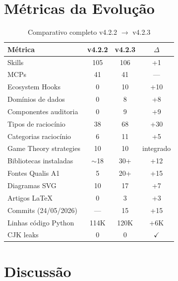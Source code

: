 \documentclass[12pt,a4paper]{article}
\begin{document}
\section{Métricas da Evolução}

\begin{table}[H]
  \centering
  \caption{Comparativo completo v4.2.2 $\rightarrow$ v4.2.3}
  \begin{tabular}{l c c c}
    \toprule
    \textbf{Métrica} & \textbf{v4.2.2} & \textbf{v4.2.3} & \textbf{$\Delta$} \\
    \midrule
    Skills                 & 105  & 106  & +1 \\
    MCPs                   & 41   & 41   & --- \\
    Ecosystem Hooks        & 0    & 10   & +10 \\
    Domínios de dados      & 0    & 8    & +8 \\
    Componentes auditoria  & 0    & 9    & +9 \\
    Tipos de raciocínio    & 38   & 68   & +30 \\
    Categorias raciocínio  & 6    & 11   & +5 \\
    Game Theory strategies & 10   & 10   & integrado \\
    Bibliotecas instaladas & $\sim$18 & 30+ & +12 \\
    Fontes Qualis A1       & 5    & 20+  & +15 \\
    Diagramas SVG          & 10   & 17   & +7 \\
    Artigos LaTeX          & 0    & 3    & +3 \\
    Commits (24/05/2026)   & ---  & 15   & +15 \\
    Linhas código Python   & 114K & 120K & +6K \\
    CJK leaks              & 0    & 0    & $\checkmark$ \\
    \bottomrule
  \end{tabular}
\end{table}

\section{Discussão}
\end{document}
